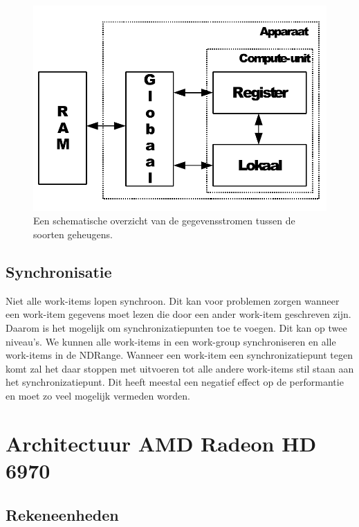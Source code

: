 \begin{figure}[]
\centering
\includegraphics[scale=0.5]{geheugenCL}
\caption{\label{geheugenCL}Een schematische overzicht van de gegevensstromen tussen de soorten geheugens.}
\end{figure}

\subsection{Synchronisatie}
Niet alle work-items lopen synchroon. Dit kan voor problemen zorgen wanneer een work-item gegevens moet lezen die door een ander work-item geschreven zijn. Daarom is het mogelijk om synchronizatiepunten toe te voegen. Dit kan op twee niveau's. We kunnen alle work-items in een work-group synchroniseren en alle work-items in de NDRange. Wanneer een work-item een synchronizatiepunt tegen komt zal het daar stoppen met uitvoeren tot alle andere work-items stil staan aan het synchronizatiepunt. Dit heeft meestal een negatief effect op de performantie en moet zo veel mogelijk vermeden worden.


\section{Architectuur AMD Radeon HD 6970}
\subsection{Rekeneenheden}


